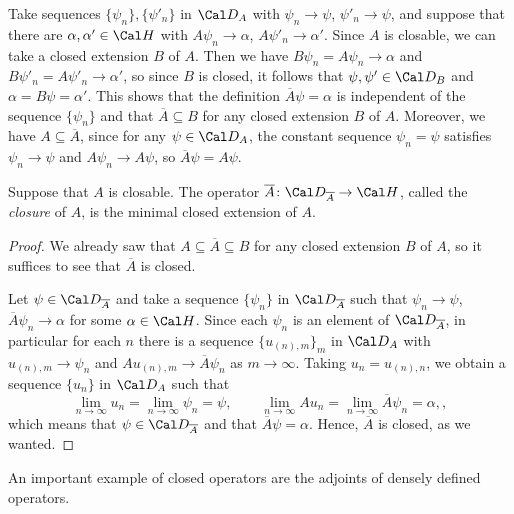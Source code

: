 Take sequences \(\{\psi_n\},\{\psi'_n\}\) in \(\Cal D_A\) with
\(\psi_n\to\psi\), \(\psi'_n\to\psi\), and suppose that there are
\(\alpha,\alpha'\in\Cal H\) with \(A\psi_n\to\alpha\),
\(A\psi'_n\to\alpha'\).
Since \(A\) is closable, we can take a closed extension \(B\) of
\(A\). Then we have \(B\psi_n=A\psi_n\to\alpha\) and
\(B\psi'_n=A\psi'_n\to\alpha'\), so since \(B\) is closed, it follows
that \(\psi,\psi'\in\Cal D_B\) and \(\alpha=B\psi=\alpha'\).
This shows that the definition \(\overline A\psi=\alpha\) is
independent of the sequence \(\{\psi_n\}\) and that \(\overline
A\subseteq B\) for any closed extension \(B\) of \(A\).
Moreover, we have \(A\subseteq \overline A\), since for any
\(\psi\in\Cal D_A\), the constant sequence \(\psi_n=\psi\) satisfies
\(\psi_n\to\psi\) and \(A\psi_n\to A\psi\), so \(\overline
A\psi=A\psi\).
\begin{proposition}
  Suppose that \(A\) is closable.
  The operator \(\overline A\colon\Cal D_{\overline A}\to\Cal H\),
  called the \emph{closure} of \(A\),
  is the minimal closed extension of \(A\).
\end{proposition}
\begin{proof}
  We already saw that \(A\subseteq \overline A\subseteq B\) for any
  closed extension \(B\) of \(A\), so it suffices to see that
  \(\overline A\) is closed.

  Let \(\psi\in\Cal D_{\overline A}\) and take a sequence \(\{\psi_n\}\)
  in \(\Cal D_{\overline A}\) such that \(\psi_n\to\psi\),
  \(\overline A\psi_n\to\alpha\) for some \(\alpha\in\Cal H\).
  Since each \(\psi_n\) is an element of \(\Cal D_{\overline A}
  \), in particular for each \(n\) 
  there is a sequence \(\{u_{(n),m}\}_m\) in \(\Cal D_A\) with
  \(u_{(n),m}\to \psi_n\) and \(Au_{(n),m}\to \overline A\psi_n\) as
  \(m\to\infty\).
  Taking \(u_n=u_{(n),n}\), we obtain a sequence \(\{u_n\}\) in \(\Cal
  D_A\) such that
  \begin{equation}
    \lim_{n\to\infty} u_n = \lim_{n\to\infty}\psi_n = \psi,
    \qquad
    \lim_{n\to\infty} Au_n = \lim_{n\to\infty}\overline A\psi_n = \alpha,
  ,\end{equation}
  which means that \(\psi\in\Cal D_{\overline A}\) and that
  \(\overline A\psi = \alpha\). Hence, \(\overline A\) is closed, as
  we wanted.
\end{proof}

An important example of closed operators are the adjoints of densely
defined operators.

